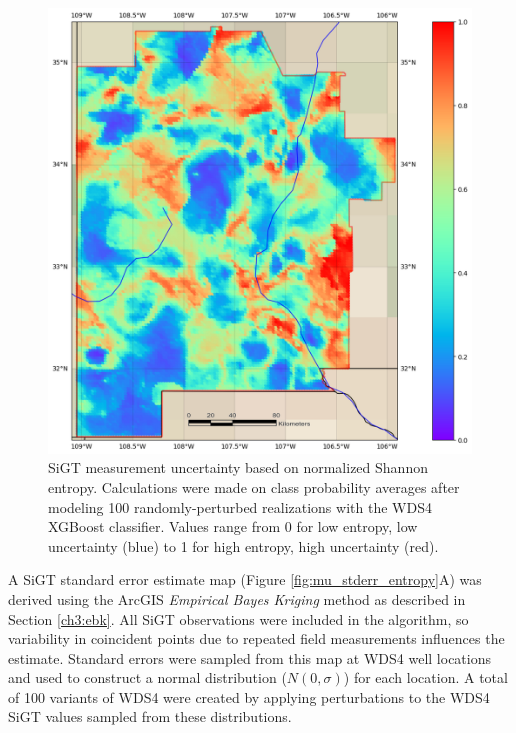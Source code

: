 \begin{figure}
\centering
\includegraphics[width=.75\textwidth]{templates/images/Figure-MU_Entropy_Map.png}
\caption[SiGT measurement uncertainty map]
{SiGT measurement uncertainty based on normalized Shannon entropy. Calculations were made on class probability averages after modeling 100 randomly-perturbed realizations with the WDS4 XGBoost classifier. Values range from 0 for low entropy, low uncertainty (blue) to 1 for high entropy, high uncertainty (red).}
\label{fig:mu_entropy_map}
\end{figure}

A SiGT standard error estimate map (Figure \ref{fig:mu_stderr_entropy}A) was derived using the ArcGIS \textit{Empirical Bayes Kriging} method as described in Section \ref{ch3:ebk}. All SiGT observations were included in the algorithm, so variability in coincident points due to repeated field measurements influences the estimate. Standard errors were sampled from this map at WDS4 well locations and used to construct a normal distribution ($N(0,\sigma)$) for each location. A total of 100 variants of WDS4 were created by applying perturbations to the WDS4 SiGT values sampled from these distributions. 

